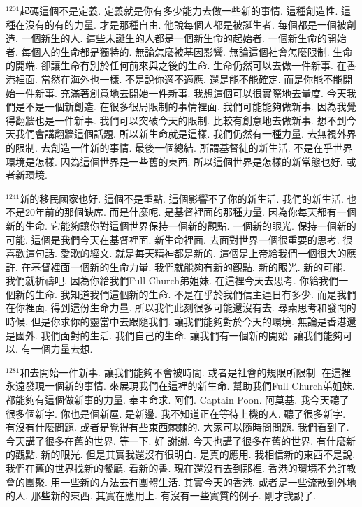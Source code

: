\documentclass{book}
\begin{document}
$^{1201}$起碼這個不是定義.
定義就是你有多少能力去做一些新的事情.
這種創造性.
這種在沒有的有的力量.
才是那種自由.
他說每個人都是被誕生者.
每個都是一個被創造.
一個新生的人.
這些未誕生的人都是一個新生命的起始者.
一個新生命的開始者.
每個人的生命都是獨特的.
無論怎麼被基因影響.
無論這個社會怎麼限制.
生命的開端.
卻讓生命有別於任何前來與之後的生命.
生命仍然可以去做一件新事.
在香港裡面.
當然在海外也一樣.
不是說你適不適應.
還是能不能確定.
而是你能不能開始一件新事.
充滿著創意地去開始一件新事.
我想這個可以很實際地去量度.
今天我們是不是一個新創造.
在很多很局限制的事情裡面.
我們可能能夠做新事.
因為我覺得翻牆也是一件新事.
我們可以突破今天的限制.
比較有創意地去做新事.
想不到今天我們會講翻牆這個話題.
所以新生命就是這樣.
我們仍然有一種力量.
去無視外界的限制.
去創造一件新的事情.
最後一個總結.
所謂基督徒的新生活.
不是在乎世界環境是怎樣.
因為這個世界是一些舊的東西.
所以這個世界是怎樣的新常態也好.
或者新環境.

$^{1241}$新的移民國家也好.
這個不是重點.
這個影響不了你的新生活.
我們的新生活.
也不是20年前的那個缺席.
而是什麼呢.
是基督裡面的那種力量.
因為你每天都有一個新的生命.
它能夠讓你對這個世界保持一個新的觀點.
一個新的眼光.
保持一個新的可能.
這個是我們今天在基督裡面.
新生命裡面.
去面對世界一個很重要的思考.
很喜歡這句話.
愛歌的經文.
就是每天精神都是新的.
這個是上帝給我們一個很大的應許.
在基督裡面一個新的生命力量.
我們就能夠有新的觀點.
新的眼光.
新的可能.
我們就祈禱吧.
因為你給我們Full Church弟姐妹.
在這裡今天去思考.
你給我們一個新的生命.
我知道我們這個新的生命.
不是在乎於我們信主連日有多少.
而是我們在你裡面.
得到這份生命力量.
所以我們此刻很多可能還沒有去.
尋索思考和發問的時候.
但是你求你的靈當中去跟隨我們.
讓我們能夠對於今天的環境.
無論是香港還是國外.
我們面對的生活.
我們自己的生命.
讓我們有一個新的開始.
讓我們能夠可以.
有一個力量去想.

$^{1281}$和去開始一件新事.
讓我們能夠不會被時間.
或者是社會的規限所限制.
在這裡永遠發現一個新的事情.
來展現我們在這裡的新生命.
幫助我們Full Church弟姐妹.
都能夠有這個做新事的力量.
奉主命求.
阿們.
Captain Poon.
阿莫基.
我今天聽了很多個新字.
你也是個新屋.
是新邊.
我不知道正在等待上機的人.
聽了很多新字.
有沒有什麼問題.
或者是覺得有些東西棘棘的.
大家可以隨時問問題.
我們看到了.
今天講了很多在舊的世界.
等一下.
好 謝謝.
今天也講了很多在舊的世界.
有什麼新的觀點.
新的眼光.
但是其實我還沒有很明白.
是真的應用.
我相信新的東西不是說.
我們在舊的世界找新的餐廳.
看新的書.
現在還沒有去到那裡.
香港的環境不允許教會的團聚.
用一些新的方法去有團體生活.
其實今天的香港.
或者是一些流散到外地的人.
那些新的東西.
其實在應用上.
有沒有一些實質的例子.
剛才我說了.
\end{document}
